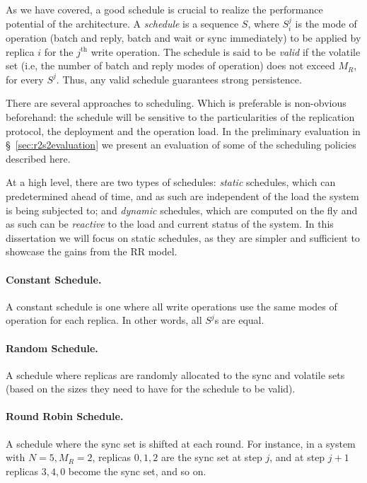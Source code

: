 As we have covered, a good schedule is crucial to realize the
performance potential of the architecture. A \emph{schedule} is a
sequence $S$, where $S_i^j$ is the mode of operation (batch and
reply, batch and wait or sync immediately) to be applied by replica
$i$ for the $j^\text{th}$ write operation. The
schedule is said to be \emph{valid} if the volatile set (i.e,
the number of batch and reply modes of operation) does not exceed
$M_R$, for every $S^j$. Thus, any valid schedule guarantees
strong persistence.

There are several approaches to scheduling. Which is preferable
is non-obvious beforehand: the schedule will be sensitive to the
particularities of the replication protocol, the deployment and
the operation load. In the preliminary evaluation in
\S~\ref{sec:r2s2evaluation} we present an
evaluation of some of the scheduling policies described
here.


At a high level, there are two types of schedules: \emph{static}
schedules, which can predetermined ahead of time, and as such
are independent of the load the system is being subjected to; and
\emph{dynamic} schedules, which are computed on the fly and as
such can be \emph{reactive} to the load and current status of the
system. In this dissertation we will focus on static schedules,
as they are simpler and sufficient to showcase the gains from the
\ac{RR} model.

\paragraph{Constant Schedule.} A constant schedule is one where
all write operations use the same modes of operation for each
replica. In other words, all $S^j$s are equal.

\paragraph{Random Schedule.} A schedule where replicas are
randomly allocated to the sync and volatile sets (based on the
sizes they need to have for the schedule to be valid).

\paragraph{Round Robin Schedule.} A schedule where the sync set
is shifted at each round. For instance, in a system with $N = 5,
M_R = 2$, replicas $0, 1, 2$ are the sync set at step $j$, and
at step $j + 1$ replicas $3, 4, 0$ become the sync set, and so
on.

